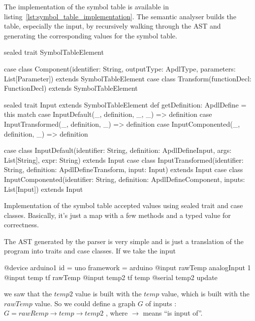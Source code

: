 The implementation of the symbol table is available in
listing~\ref{lst:symbol_table_implementation}. The semantic analyser builds the
table, especially the input, by recursively walking through the \gls{AST} and
generating the corresponding values for the symbol table.

\begin{listing}[!htbp]
  \centering
\begin{scalacode}
sealed trait SymbolTableElement

case class Component(identifier: String,
                     outputType: ApdlType,
                     parameters: List[Parameter]) extends SymbolTableElement
case class Transform(functionDecl: FunctionDecl) extends SymbolTableElement

sealed trait Input extends SymbolTableElement {
  def getDefinition: ApdlDefine = this match {
    case InputDefault(_, definition, _, _) => definition
    case InputTransformed(_, definition, _) => definition
    case InputComponented(_, definition, _) => definition
  }
}

case class InputDefault(identifier: String,
                        definition: ApdlDefineInput,
                        args: List[String],
                        expr: String) extends Input
case class InputTransformed(identifier: String,
                            definition: ApdlDefineTransform,
                            input: Input) extends Input
case class InputComponented(identifier: String,
                            definition: ApdlDefineComponent,
                            inputs: List[Input]) extends Input
\end{scalacode}
  \caption[Scala's implementation of the symbol table accepted values]{Implementation of the
symbol table accepted values using sealed trait and case classes. Basically,
it's just a map with a few methods and a typed value for
correctness.} \label{lst:symbol_table_implementation}
\end{listing}

The \gls{AST} generated by the parser is very simple and is just a translation of
the program into traits and case classes. If we take the input

\begin{inlineapdl}
@device arduino1 {
    id = uno
    framework = arduino
    @input rawTemp analogInput 1
    @input temp tf rawTemp
    @input temp2 tf temp
    @serial temp2 update
}
\end{inlineapdl}

we saw that the $temp2$ value is built with the $temp$ value, which is built
with the $rawTemp$ value. So we could define a graph $G$ of inputs : $G =
rawRemp \rightarrow temp \rightarrow temp2$ , where $\rightarrow$ means ``is
input of''.

